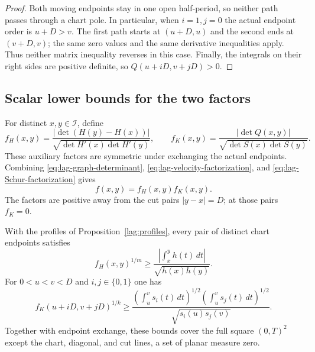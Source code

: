 \begin{proof}
Both moving endpoints stay in one open half-period, so neither path
passes through a chart pole.  In particular, when $i=1,j=0$ the actual
endpoint order is $u+D>v$.  The first path starts at $(u+D,u)$ and the
second ends at $(v+D,v)$; the same zero values and the same derivative
inequalities apply.  Thus neither matrix inequality reverses in this
case.  Finally, the integrals on their right sides are positive
definite, so $Q(u+iD,v+jD)>0$.
\end{proof}

\subsection{Scalar lower bounds for the two factors}

For distinct $x,y\in\mathcal I$, define
\begin{equation}
 f_H(x,y)=
 \frac{|\det(H(y)-H(x))|}
 {\sqrt{\det H'(x)\det H'(y)}},\qquad
 f_K(x,y)=
 \frac{|\det Q(x,y)|}
 {\sqrt{\det S(x)\det S(y)}}.
 \label{eq:lag-two-factors}
\end{equation}
These auxiliary factors are symmetric under exchanging the actual
endpoints.  Combining \eqref{eq:lag-graph-determinant},
\eqref{eq:lag-velocity-factorization}, and
\eqref{eq:lag-Schur-factorization} gives
\begin{equation}
 f(x,y)=f_H(x,y)f_K(x,y).
 \label{eq:lag-factorization}
\end{equation}
The factors are positive away from the cut pairs $|y-x|=D$; at those
pairs $f_K=0$.

\begin{proposition}
\label{lag:block-bounds}
With the profiles of Proposition~\ref{lag:profiles}, every pair of
distinct chart endpoints satisfies
\begin{equation}
 f_H(x,y)^{1/m}\ge
 \frac{\left|\int_x^y h(t)\,dt\right|}{\sqrt{h(x)h(y)}}.
 \label{eq:lag-H-scalar-bound}
\end{equation}
For $0<u<v<D$ and $i,j\in\{0,1\}$ one has
\begin{equation}
 f_K(u+iD,v+jD)^{1/k}\ge
 \frac{
  \left(\int_u^v s_i(t)\,dt\right)^{1/2}
  \left(\int_u^v s_j(t)\,dt\right)^{1/2}}
 {\sqrt{s_i(u)s_j(v)}}.
 \label{eq:lag-K-scalar-bound}
\end{equation}
Together with endpoint exchange, these bounds cover the full square
$(0,T)^2$ except the chart, diagonal, and cut lines, a set of planar
measure zero.
\end{proposition}

